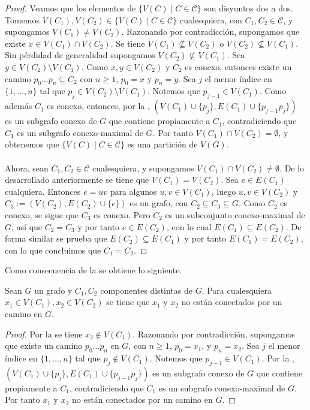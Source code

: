 \begin{proof}
   Veamos que los elementos de $\{V(C)\mid C\in\mathcal{C}\}$ son disyuntos dos a dos. Tomemos $V(C_1),V(C_2)\in \{V(C)\mid C\in\mathcal{C}\}$ cualesquiera, con $C_1,C_2\in\mathcal{C}$, y supongamos $V(C_1)\ne V(C_2)$. Razonando por contradicción, supongamos que existe $x\in V(C_1)\cap V(C_2)$. Se tiene $V(C_1)\nsubseteq V(C_2)$ o $V(C_2)\nsubseteq V(C_1)$. Sin pérdidad de generalidad supongamos $V(C_2)\nsubseteq V(C_1)$. Sea $y\in V(C_2)\setminus V(C_1)$. Como $x,y\in V(C_2)$ y $C_2$ es conexo, entonces existe un camino $p_0\dots p_n\subseteq C_2$ con $n\ge 1$, $p_0=x$ y $p_n=y$. Sea $j$ el menor índice en $\{1,\dots, n\}$ tal que $p_j \in V(C_2)\setminus V(C_1)$. Notemos que $p_{j-1}\in V(C_1)$. Como además $C_1$ es conexo, entonces, por la , $(V(C_1)\cup \{p_j\},E(C_1)\cup \{p_{j-1}p_j\})$ es un subgrafo conexo de $G$ que contiene propiamente a $C_1$, contradiciendo que $C_1$ es un subgrafo conexo-maximal de $G$. Por tanto $V(C_1)\cap V(C_2)=\emptyset$, y obtenemos que $\{V(C)\mid C\in\mathcal{C}\}$ es una partición de $V(G)$.\\\\
   Ahora, sean $C_1,C_2\in\mathcal{C}$ cualesquiera, y supongamos $V(C_1)\cap V(C_2)\ne \emptyset$. De lo desarrollado anteriormente se tiene que $V(C_1)=V(C_2)$. Sea $e\in E(C_1)$ cualquiera. Entonces $e=uv$ para algunos $u,v\in V(C_1)$, luego $u,v\in V(C_2)$ y $C_3:=\left( V(C_2),E(C_2)\cup \{e\}\right)$ es un grafo, con $C_2\subseteq C_3\subseteq G$. Como $C_2$ es conexo, se sigue que $C_3$ es conexo. Pero $C_2$ es un subconjunto conexo-maximal de $G$, así que $C_2=C_3$ y por tanto $e\in E(C_2)$, con lo cual $E(C_1)\subseteq E(C_2)$. De forma similar se prueba que $E(C_2)\subseteq E(C_1)$ y por tanto $E(C_1)=E(C_2)$, con lo que concluimos que $C_1=C_2$. 
\end{proof}
Como consecuencia de la  se obtiene lo siguiente.
\begin{Prop}\label{Prop:Componentes_no_conectan}
   Sean $G$ un grafo y $C_1, C_2$ componentes distintas de $G$. Para cualesquiera $x_1\in V(C_1), x_2\in V(C_2)$ se tiene que $x_1$ y $x_2$ no están conectados por un camino en $G$.
\end{Prop}
\begin{proof}
   Por la  se tiene $x_2\notin V(C_1)$. Razonando por contradicción, supongamos que existe un camino $p_0\dots p_n$ en $G$, con $n\ge 1$, $p_0=x_1$, y $p_n=x_2$. Sea $j$ el menor índice en $\{1,\dots ,n\}$ tal que $p_j\notin V(C_1)$. Notemos que $p_{j-1}\in V(C_1)$. Por la , $\left( V(C_1)\cup \{p_{j}\},E(C_1)\cup\{p_{j-1}p_j\}\right)$ es un subgrafo conexo de $G$ que contiene propiamente a $C_1$, contradiciendo que $C_1$ es un subgrafo conexo-maximal de $G$. Por tanto $x_1$ y $x_2$ no están conectados por un camino en $G$.
\end{proof}
